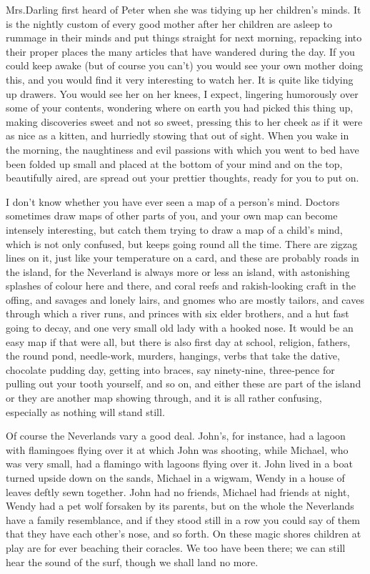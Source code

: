 Mrs.\@ Darling first heard of Peter when she was tidying up her children’s minds.
It is the nightly custom of every good mother after her children are asleep
to rummage in their minds and put things straight for next morning,
repacking into their proper places the many articles that have wandered during the day.
If you could keep awake (but of course you can’t) you would see your own mother doing this,
and you would find it very interesting to watch her.
It is quite like tidying up drawers.
You would see her on her knees, I expect,
lingering humorously over some of your contents,
wondering where on earth you had picked this thing up,
making discoveries sweet and not so sweet,
pressing this to her cheek as if it were as nice as a kitten,
and hurriedly stowing that out of sight.
When you wake in the morning,
the naughtiness and evil passions with which you went to bed
have been folded up small and placed at the bottom of your mind
and on the top, beautifully aired, are spread out your prettier thoughts,
ready for you to put on.

I don’t know whether you have ever seen a map of a person’s mind.
Doctors sometimes draw maps of other parts of you,
and your own map can become intensely interesting,
but catch them trying to draw a map of a child’s mind,
which is not only confused, but keeps going round all the time.
There are zigzag lines on it, just like your temperature on a card,
and these are probably roads in the island,
for the Neverland is always more or less an island,
with astonishing splashes of colour here and there,
and coral reefs and rakish‐looking craft in the offing,
and savages and lonely lairs,
and gnomes who are mostly tailors,
and caves through which a river runs,
and princes with six elder brothers,
and a hut fast going to decay,
and one very small old lady with a hooked nose.
It would be an easy map if that were all,
but there is also first day at school, religion, fathers, the round pond, needle‐work, murders, hangings,
verbs that take the dative, chocolate pudding day, getting into braces, say ninety‐nine,
three‐pence for pulling out your tooth yourself, and so on,
and either these are part of the island or they are another map showing through,
and it is all rather confusing, especially as nothing will stand still.

Of course the Neverlands vary a good deal.
John’s, for instance, had a lagoon with flamingoes flying over it at which John was shooting,
while Michael, who was very small, had a flamingo with lagoons flying over it.
John lived in a boat turned upside down on the sands, Michael in a wigwam,
Wendy in a house of leaves deftly sewn together.
John had no friends, Michael had friends at night, Wendy had a pet wolf forsaken by its parents,
but on the whole the Neverlands have a family resemblance,
and if they stood still in a row you could say of them that they have each other’s nose, and so forth.
On these magic shores children at play are for ever beaching their coracles.
We too have been there;
we can still hear the sound of the surf, though we shall land no more.

